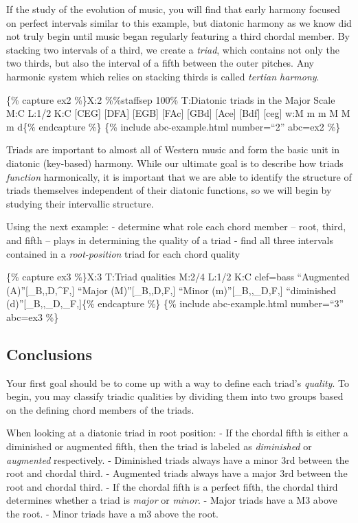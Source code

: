 \documentclass{book}
\begin{document}
If the study of the evolution of music, you will find that early harmony
focused on perfect intervals similar to this example, but diatonic harmony as
we know did not truly begin until music began regularly featuring a third
chordal member. By stacking two intervals of a third, we create a
\emph{triad}, which contains not only the two thirds, but also the interval of
a fifth between the outer pitches. Any harmonic system which relies on
stacking thirds is called \emph{tertian harmony}.

\{\% capture ex2 \%\}X:2 \%\%staffsep 100\% T:Diatonic triads in the Major
Scale M:C L:1/2 K:C {[}CEG{]} {[}DFA{]}\textbar{} {[}EGB{]}
{[}FAc{]}\textbar{} {[}GBd{]} {[}Ace{]}\textbar{} {[}Bdf{]}
{[}ceg{]}\textbar\textbar{} w:M m m M M m d\{\% endcapture \%\} \{\% include
abc-example.html number=``2'' abc=ex2 \%\}

Triads are important to almost all of Western music and form the basic unit in
diatonic (key-based) harmony. While our ultimate goal is to describe how
triads \emph{function} harmonically, it is important that we are able to
identify the structure of triads themselves independent of their diatonic
functions, so we will begin by studying their intervallic structure.

Using the next example: - determine what role each chord member -- root,
third, and fifth -- plays in determining the quality of a triad - find all
three intervals contained in a \emph{root-position} triad for each chord
quality

\{\% capture ex3 \%\}X:3 T:Triad qualities M:2/4 L:1/2 K:C clef=bass
``Augmented (A)''{[}\_B,,D,\^{}F,{]}\textbar{} ``Major
(M)''{[}\_B,,D,F,{]}\textbar{} ``Minor (m)''{[}\_B,,\_D,F,{]}\textbar{}
``diminished (d)''{[}\_B,,\_D,\_F,{]}\textbar\textbar\{\% endcapture \%\} \{\%
include abc-example.html number=``3'' abc=ex3 \%\}

\hypertarget{conclusions-22}{%
\subsection{Conclusions}\label{conclusions-22}}

Your first goal should be to come up with a way to define each triad's
\emph{quality}. To begin, you may classify triadic qualities by dividing them
into two groups based on the defining chord members of the triads.

When looking at a diatonic triad in root position: - If the chordal fifth is
either a diminished or augmented fifth, then the triad is labeled as
\emph{diminished} or \emph{augmented} respectively. - Diminished triads always
have a minor 3rd between the root and chordal third. - Augmented triads always
have a major 3rd between the root and chordal third. - If the chordal fifth is
a perfect fifth, the chordal third determines whether a triad is \emph{major}
or \emph{minor}. - Major triads have a M3 above the root. - Minor triads have
a m3 above the root.
\end{document}
